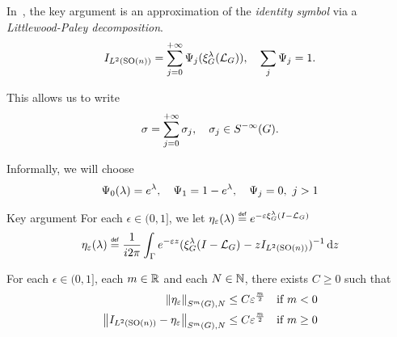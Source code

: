 \documentclass{beamer}
\begin{document}
\begin{frame}
    In~\cite{Fischer2015,FischerRuzhansky16},
    the key argument is an approximation of the \emph{identity symbol} via a \emph{Littlewood-Paley decomposition}.
    \begin{align*}
        \Id {\Lebesgue 2 {\SpecialOrthogonalGroup n}} = \sum_{j = 0}^{+ \infty} \Psi_j(\Rep \lambda (\Laplacian)),
        \quad \sum_j \Psi_j = 1.
    \end{align*}

    \pause

    This allows us to write
    \begin{align*}
        \sigma = \sum_{j = 0}^{+ \infty} \sigma_j,
        \quad
        \sigma_j \in \SmoothingSymbols.
    \end{align*}

    \pause

    Informally, we will choose
    \begin{align*}
        \Psi_0(\lambda) = \e^{\lambda}, \quad \Psi_1 = 1 - \e^{\lambda},
        \quad \Psi_j = 0, \ j > 1
    \end{align*}
\end{frame}

\begin{frame}{Key argument}
    For each $\epsilon \in (0, 1]$,
    we let $\eta_\epsilon(\lambda) \defeq \e^{-\epsilon \Rep \lambda \BesselPotentialSquared {}}$
    \begin{align*}
        \eta_\epsilon(\lambda)
        \defeq
        \frac 1 {\i \turn}
        \int_\Gamma
        \e^{-\epsilon z}
        (\Rep \lambda \BesselPotentialSquared {} - z \Id {\Lebesgue 2 {\SpecialOrthogonalGroup n}})^{-1}
        \dd z
    \end{align*}

    \pause

    \begin{theorem}
        For each $\epsilon \in (0, 1]$, each $m \in \R$ and each $N \in \N$,
        there exists $C \geq 0$ such that
        \begin{align*}
                \SymbolSemiNorm m {} N {\eta_\epsilon}
                &\leq C \epsilon^\frac m 2
                & \text{if } m < 0\\
                \SymbolSemiNorm m {} N {\Id {\Lebesgue 2 {\SpecialOrthogonalGroup n}} - \eta_\epsilon}
                &\leq C \epsilon^\frac m 2
                & \text{if } m \geq 0
        \end{align*}
    \end{theorem}
\end{frame}
\end{document}
